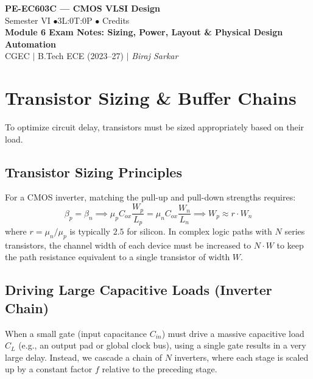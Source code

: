 \documentclass[12pt,a4paper]{article}
\begin{document}

\begin{center}
  {\LARGE\bfseries\color{myred} PE-EC603C --- CMOS VLSI Design}\\[5pt]
  {\normalsize\color{mydark} Semester VI \quad$\bullet$\quad 3L:0T:0P \quad$\bullet$ Credits}\\[3pt]
  {\normalsize\color{myteal}\textbf{Module 6 Exam Notes: Sizing, Power, Layout \& Physical Design Automation}}\\[3pt]
  {\small\color{mydark} CGEC \;$|$\; B.Tech ECE (2023--27) \;$|$\; \textit{Biraj Sarkar}}
\end{center}
\vspace{2pt}
\noindent{\color{myred}\rule{\linewidth}{1.5pt}}
\vspace{2pt}

\hypersetup{linkcolor=mydark}
\tableofcontents
\hypersetup{linkcolor=myteal}
\newpage

\section{Transistor Sizing \& Buffer Chains}

To optimize circuit delay, transistors must be sized appropriately based on their load.

\subsection{Transistor Sizing Principles}
For a CMOS inverter, matching the pull-up and pull-down strengths requires:
\begin{equation}
  \beta_p = \beta_n \implies \mu_p C_{ox} \frac{W_p}{L_p} = \mu_n C_{ox} \frac{W_n}{L_n} \implies W_p \approx r \cdot W_n
\end{equation}
where $r = \mu_n / \mu_p$ is typically $2.5$ for silicon. In complex logic paths with $N$ series transistors, the channel width of each device must be increased to $N \cdot W$ to keep the path resistance equivalent to a single transistor of width $W$.

\subsection{Driving Large Capacitive Loads (Inverter Chain)}
When a small gate (input capacitance $C_{in}$) must drive a massive capacitive load $C_L$ (e.g., an output pad or global clock bus), using a single gate results in a very large delay. Instead, we cascade a chain of $N$ inverters, where each stage is scaled up by a constant factor $f$ relative to the preceding stage.
\end{document}
